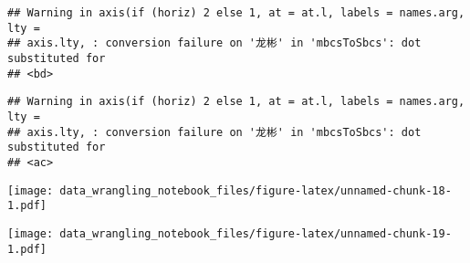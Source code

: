 \documentclass[
]{article}
\newenvironment{Shaded}{\begin{snugshade}}{\end{snugshade}}
\newcommand{\AttributeTok}[1]{\textcolor[rgb]{0.77,0.63,0.00}{#1}}
\newcommand{\CommentTok}[1]{\textcolor[rgb]{0.56,0.35,0.01}{\textit{#1}}}
\newcommand{\DecValTok}[1]{\textcolor[rgb]{0.00,0.00,0.81}{#1}}
\newcommand{\FloatTok}[1]{\textcolor[rgb]{0.00,0.00,0.81}{#1}}
\newcommand{\FunctionTok}[1]{\textcolor[rgb]{0.00,0.00,0.00}{#1}}
\newcommand{\NormalTok}[1]{#1}
\newcommand{\OtherTok}[1]{\textcolor[rgb]{0.56,0.35,0.01}{#1}}
\newcommand{\SpecialCharTok}[1]{\textcolor[rgb]{0.00,0.00,0.00}{#1}}
\begin{document}
\begin{verbatim}
## Warning in axis(if (horiz) 2 else 1, at = at.l, labels = names.arg, lty =
## axis.lty, : conversion failure on '龙彬' in 'mbcsToSbcs': dot substituted for
## <bd>
\end{verbatim}

\begin{verbatim}
## Warning in axis(if (horiz) 2 else 1, at = at.l, labels = names.arg, lty =
## axis.lty, : conversion failure on '龙彬' in 'mbcsToSbcs': dot substituted for
## <ac>
\end{verbatim}

\texttt{[image: data\_wrangling\_notebook\_files/figure-latex/unnamed-chunk-18-1.pdf]}

\begin{Shaded}
\end{Shaded}

\texttt{[image: data\_wrangling\_notebook\_files/figure-latex/unnamed-chunk-19-1.pdf]}
\end{document}

